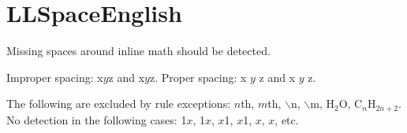 \section{LLSpaceEnglish}

Missing spaces around inline math should be detected.

Improper spacing: x\(y\)z and x$y$z.
Proper spacing: x \(y\) z and x $y$ z.

The following are excluded by rule exceptions: $n$th, \(m\)th, $\backslash$n, \(\backslash\)m, H\({}_2\)O, C\({}_{n}\)H\({}_{2n+2}\).\\
No detection in the following cases:  1$x$, 1\(x\), $x$1, \(x\)1, $x$, \(x\), etc.
